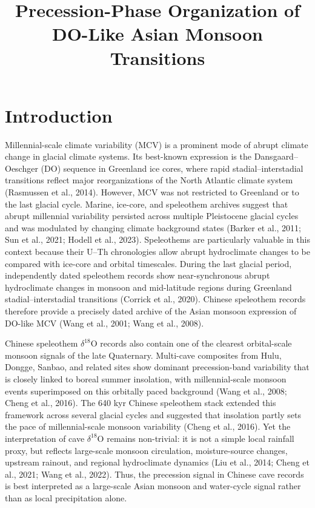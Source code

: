 \documentclass[11pt]{article}
\title{Precession-Phase Organization of DO-Like Asian Monsoon Transitions}
\author{}
\date{}
\begin{document}
\maketitle

\section*{Introduction}

Millennial-scale climate variability (MCV) is a prominent mode of abrupt climate change in glacial climate systems. Its best-known expression is the Dansgaard--Oeschger (DO) sequence in Greenland ice cores, where rapid stadial--interstadial transitions reflect major reorganizations of the North Atlantic climate system (Rasmussen et al., 2014). However, MCV was not restricted to Greenland or to the last glacial cycle. Marine, ice-core, and speleothem archives suggest that abrupt millennial variability persisted across multiple Pleistocene glacial cycles and was modulated by changing climate background states (Barker et al., 2011; Sun et al., 2021; Hodell et al., 2023). Speleothems are particularly valuable in this context because their U--Th chronologies allow abrupt hydroclimate changes to be compared with ice-core and orbital timescales. During the last glacial period, independently dated speleothem records show near-synchronous abrupt hydroclimate changes in monsoon and mid-latitude regions during Greenland stadial--interstadial transitions (Corrick et al., 2020). Chinese speleothem records therefore provide a precisely dated archive of the Asian monsoon expression of DO-like MCV (Wang et al., 2001; Wang et al., 2008).

Chinese speleothem \(\delta^{18}\mathrm{O}\) records also contain one of the clearest orbital-scale monsoon signals of the late Quaternary. Multi-cave composites from Hulu, Dongge, Sanbao, and related sites show dominant precession-band variability that is closely linked to boreal summer insolation, with millennial-scale monsoon events superimposed on this orbitally paced background (Wang et al., 2008; Cheng et al., 2016). The 640 kyr Chinese speleothem stack extended this framework across several glacial cycles and suggested that insolation partly sets the pace of millennial-scale monsoon variability (Cheng et al., 2016). Yet the interpretation of cave \(\delta^{18}\mathrm{O}\) remains non-trivial: it is not a simple local rainfall proxy, but reflects large-scale monsoon circulation, moisture-source changes, upstream rainout, and regional hydroclimate dynamics (Liu et al., 2014; Cheng et al., 2021; Wang et al., 2022). Thus, the precession signal in Chinese cave records is best interpreted as a large-scale Asian monsoon and water-cycle signal rather than as local precipitation alone.
\end{document}
